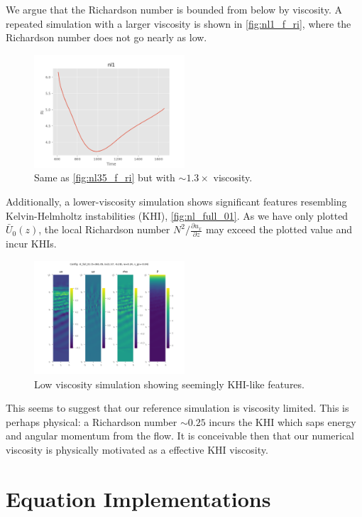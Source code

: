 \documentclass[twocolumn,
        nofootinbib,
        usenames, %
        dvipsnames %
    ]{revtex4-1}%
\newcommand*{\pd}[2]{\frac{\partial#1}{\partial#2}}
\begin{document}
We argue that the Richardson number is bounded from below by viscosity. A
repeated simulation with a larger viscosity is shown in \autoref{fig:nl1_f_ri},
where the Richardson number does not go nearly as low.
\begin{figure}[h]
    \centering
    \includegraphics[width=0.5\textwidth]{plots/nl1_f_ri.png}
    \caption{Same as \autoref{fig:nl35_f_ri} but with $\sim 1.3\times$
    viscosity.}\label{fig:nl1_f_ri}
\end{figure}

Additionally, a lower-viscosity simulation shows significant features resembling
Kelvin-Helmholtz instabilities (KHI), \autoref{fig:nl_full_01}. As we have only
plotted $\bar{U}_0(z)$, the local Richardson number $N^2 / \pd{u_x}{z}$ may
exceed the plotted value and incur KHIs.
\begin{figure}[h]
    \centering
    \includegraphics[width=0.5\textwidth]{plots/nl_full_01.png}
    \caption{Low viscosity simulation showing seemingly KHI-like
    features.}\label{fig:nl_full_01}
\end{figure}

This seems to suggest that our reference simulation is viscosity limited. This
is perhaps physical: a Richardson number $\sim 0.25$ incurs the KHI which saps
energy and angular momentum from the flow. It is conceivable then that our
numerical viscosity is physically motivated as a effective KHI viscosity.

\clearpage
\onecolumngrid
\appendix

\section{Equation Implementations}
\end{document}
